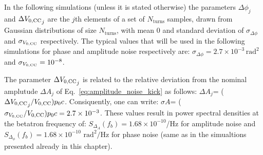 In the following simulations (unless it is stated otherwise) the parameters $\Delta \phi_j$ and $\Delta {V_\mathrm{0, CC}}_j$ are the $j$th elements of a set of $N_\mathrm{turns}$ samples, drawn from Gaussian distributions of size $N_\mathrm{turns}$, with mean 0 and standard deviation of $\sigma_{\Delta \phi}$ and  $\sigma_{{V_\mathrm{0, CC}}}$ respectively. The typical values that will be used in the following simulations for phase and amplitude noise respectively are: $\sigma_{\Delta \phi}=2.7 \times 10^{-3}$\,$\mathrm{rad^2}$ and $\sigma_{{V_\mathrm{0, CC}}}=10^{-8}$. 

The parameter $\Delta {V_\mathrm{0, CC}}_j$ is related to the relative deviation from the nominal amplutude $\Delta A_j$ of Eq.~\ref{eq:amplitude_noise_kick} as follows:  $\Delta A_j$= ($\Delta {V_\mathrm{0, CC}}_j / {V_\mathrm{0, CC}}) p_0 c$. Consiquently, one can write: $\sigma A$= ($\sigma_{{V_\mathrm{0, CC}}} / {V_\mathrm{0, CC}}) p_0 c = 2.7\times 10^{-3}$. These values result in power spectral densities at the betatron frequency of: $S_{\Delta_A}(f_b) = 1.68 \times 10^{-10}$/Hz for amplitude noise and $S_{\Delta_\phi}(f_b) = 1.68 \times 10^{-10}$ $\mathrm{rad^2/Hz}$ for phase noise (same as in the simualtions presented already in this chapter).






